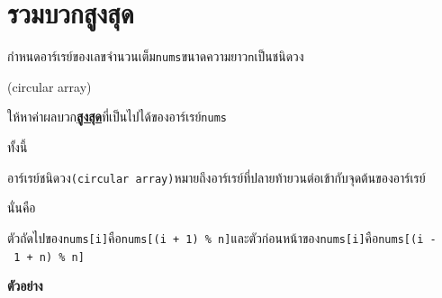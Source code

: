 \documentclass{article}
\begin{document}
\section*{รวมบวกสูงสุด}

กำหนดอาร์เรย์ของเลขจำนวนเต็ม\texttt{nums}ขนาดความยาว\texttt{n}เป็นชนิดวง

(circular array)

ให้หาค่าผลบวก\textbf{\ul{สูงสุด}}ที่เป็นไปได้ของอาร์เรย์\texttt{nums}



\hfill\break



ทั้งนี้

อาร์เรย์ชนิดวง\texttt{(circular\ array)}หมายถึงอาร์เรย์ที่ปลายท้ายวนต่อเข้ากับจุดต้นของอาร์เรย์

นั่นคือ

ตัวถัดไปของ\texttt{nums{[}i{]}}คือ\texttt{nums{[}(i\ +\ 1)\ \%\ n{]}}และตัวก่อนหน้าของ\texttt{nums{[}i{]}}คือ\texttt{nums{[}(i\ -\ 1\ +\ n)\ \%\ n{]}}\\



\hfill\break



\textbf{ตัวอย่าง}
\end{document}
